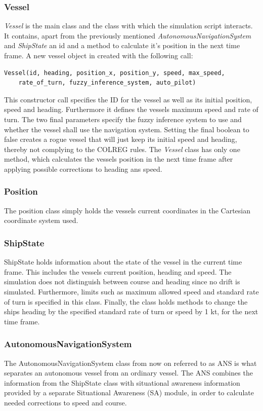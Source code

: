\subsubsection{Vessel}
\textit{Vessel} is the main class and the class with which the simulation script interacts.
It contains, apart from the previously mentioned \textit{AutonomousNavigationSystem} and \textit{ShipState} an id and a method to calculate it's position in the next time frame.
A new vessel object in created with the following call:
\begin{verbatim}
Vessel(id, heading, position_x, position_y, speed, max_speed, 
    rate_of_turn, fuzzy_inference_system, auto_pilot)
\end{verbatim}
This constructor call specifies the ID for the vessel as well as its initial position, speed and heading. Furthermore it defines the vessels maximum speed and rate of turn. The two final parameters specify the fuzzy inference system to use and whether the vessel shall use the navigation system. Setting the final boolean to false creates a rogue vessel that will just keep its initial speed and heading, thereby not complying to the COLREG rules. The \textit{Vessel} class has only one method, which calculates the vessels position in the next time frame after applying possible corrections to heading ans speed.
\subsubsection{Position}
The position class simply holds the vessels current coordinates in the Cartesian coordinate system used.
\subsubsection{ShipState}
ShipState holds information about the state of the vessel in the current time frame. This includes the vessels current position, heading and speed. The simulation does not distinguish between course and heading since no drift is simulated.
Furthermore, limits such as maximum allowed speed and standard rate of turn is specified in this class. Finally, the class holds methods to change the ships heading by the specified standard rate of turn or speed by 1 kt, for the next time frame.


\subsubsection{AutonomousNavigationSystem}
\label{sec:ANS}
The AutonomousNavigationSystem class from now on referred to as ANS is what separates an autonomous vessel from an ordinary vessel. The ANS combines the information from the ShipState class with situational awareness information provided by a separate Situational Awareness (SA) module, in order to calculate needed corrections to speed and course.

